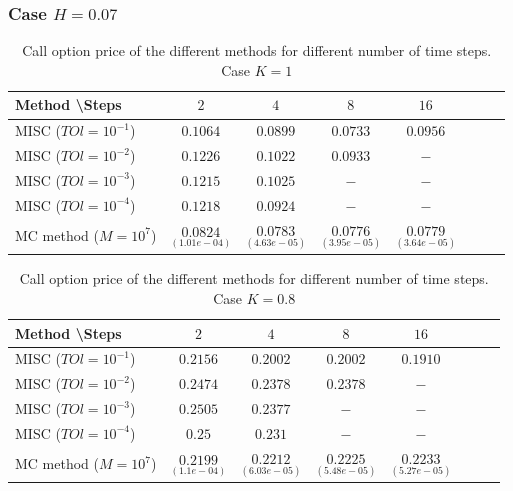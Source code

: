 \documentclass[11pt]{article}
\begin{document}
\subsubsection*{Case $H=0.07$}

\begin{table}[h!]
	\centering
	\begin{tabular}{l*{6}{c}r}
		Method \textbackslash  Steps            & $2$ & $4$ & $8$ & $16$  \\
		\hline
		MISC ($TOl=10^{-1}$)  & $0.1064$ & $0.0899$ & $0.0733$ & $0.0956$  \\
		MISC ($TOl=10^{-2}$)  & $0.1226$ & $0.1022$ & $0.0933$ & $-$  \\
		MISC ($TOl=10^{-3}$)        & $0.1215$ &$0.1025$ &  $-$ &  $-$ \\
		MISC ($TOl=10^{-4}$)    & $0.1218$ & $0.0924$  & $-$ & $-$  \\
		MC method ($M=10^{7}$)   & $\underset{(1.01e-04)}{0.0824} $  & $\underset{(4.63e-05)}{0.0783} $  & $\underset{ (3.95e-05)}{0.0776}$ & $\underset {(3.64e-05)}{0.0779} $  \\		
		\hline
	\end{tabular}
	\caption{ Call option price of the different methods for different number of time steps. Case $K=1$}
	\label{table: Call option price of the different methods for different number of time steps. Case $K=1$_H_007}
\end{table}

\begin{table}[h!]
	\centering
	\begin{tabular}{l*{6}{c}r}
		Method \textbackslash  Steps            & $2$ & $4$ & $8$ & $16$  \\
		\hline
		MISC ($TOl=10^{-1}$)  & $0.2156$ & $0.2002$ &  $0.2002$ &  $0.1910$  \\
		MISC ($TOl=10^{-2}$)  &  $0.2474$ &  $0.2378$ &  $0.2378$ & $-$  \\
		MISC ($TOl=10^{-3}$)        &  $0.2505$ & $0.2377$ &   $-$ &  $-$ \\
		MISC ($TOl=10^{-4}$)    &  $0.25$ &  $0.231$  & $-$ & $-$  \\
		MC method ($M=10^{7}$)   & $\underset{(1.1e-04)}{0.2199} $   & $\underset{(6.03e-05)}{0.2212} $  & $\underset{(5.48e-05)}{0.2225}$ & $\underset{(5.27e-05)}{0.2233} $  \\			
		\hline
	\end{tabular}
	\caption{ Call option price of the different methods for different number of time steps. Case $K=0.8$}
	\label{table: Call option price of the different methods for different number of time steps. Case $K=0.8$_H_007}
\end{table}
\end{document}
